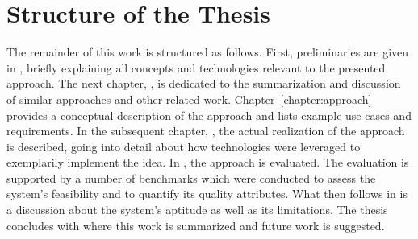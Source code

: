 \section{Structure of the Thesis}
The remainder of this work is structured as follows. First, preliminaries are given in , briefly explaining all concepts and technologies relevant to the presented approach. The next chapter, , is dedicated to the summarization and discussion of similar approaches and other related work. Chapter~\ref{chapter:approach} provides a conceptual description of the approach and lists example use cases and requirements. In the subsequent chapter, , the actual realization of the approach is described, going into detail about how technologies were leveraged to exemplarily implement the idea. In , the approach is evaluated. The evaluation is supported by a number of benchmarks which were conducted to assess the system's feasibility and to quantify its quality attributes. What then follows in  is a discussion about the system's aptitude as well as its limitations. The thesis concludes with  where this work is summarized and future work is suggested.

%
%
%
%
%
%
%
%
%
%
%
%
%
%
%
%
%
%
%
%
%
%
%
%
%
%
%
%
%
%
%
%
%
%
%
%
%
%
